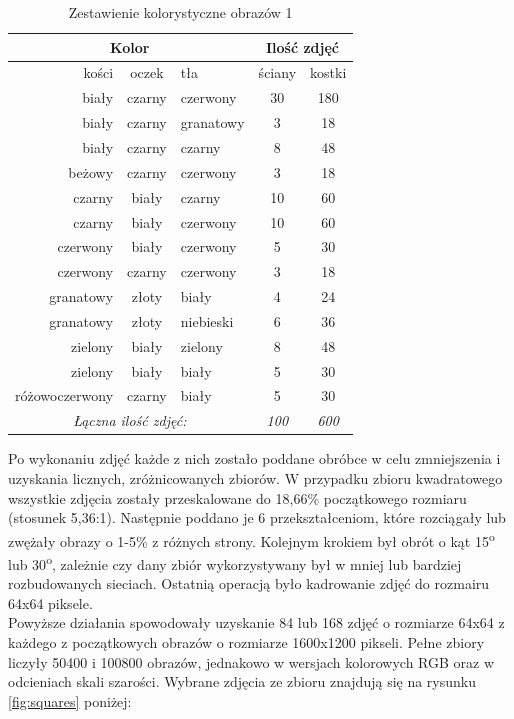 \begin{table}[h!]
\centering
\begin{tabular}{rcl|cc}
\multicolumn{3}{c}{Kolor} & \multicolumn{2}{c}{Ilość zdjęć} \\ \hline
kości & oczek & tła & ściany & kostki \\ \hline
biały & czarny & czerwony & 30 & 180 \\
biały & czarny & granatowy & 3 & 18 \\
biały & czarny & czarny & 8 & 48 \\
beżowy & czarny & czerwony & 3 & 18 \\
czarny & biały & czarny & 10 & 60 \\
czarny & biały & czerwony & 10 & 60 \\
czerwony & biały & czerwony & 5 & 30 \\
czerwony & czarny & czerwony & 3 & 18 \\
granatowy & złoty & biały & 4 & 24 \\
granatowy & złoty & niebieski & 6 & 36 \\
zielony & biały & zielony & 8 & 48 \\
zielony & biały & biały & 5 & 30 \\
różowoczerwony & czarny & biały & 5 & 30 \\ \hline
\multicolumn{3}{c}{\textit{Łączna ilość zdjęć:}} & \textit{100} & \textit{600}
\end{tabular}
\vspace{0.2cm}
\caption{Zestawienie kolorystyczne obrazów 1}
\label{tab:zestawienie1}
\end{table}
Po wykonaniu zdjęć każde z nich zostało poddane obróbce w celu zmniejszenia i uzyskania licznych,
zróżnicowanych zbiorów. W przypadku zbioru kwadratowego wszystkie zdjęcia zostały przeskalowane
do 18,66\% początkowego rozmiaru (stosunek 5,36:1). Następnie poddano je 6 przekształceniom, które
rozciągały lub zwężały obrazy o 1-5\% z różnych strony. Kolejnym krokiem był obrót o kąt
15\textsuperscript{o} lub 30\textsuperscript{o}, zależnie czy dany zbiór wykorzystywany był w mniej
lub bardziej rozbudowanych sieciach. Ostatnią operacją było kadrowanie zdjęć do rozmairu 64x64 piksele.\\
Powyższe działania spowodowały uzyskanie 84 lub 168 zdjęć o rozmiarze 64x64 z każdego
z początkowych obrazów o rozmiarze 1600x1200 pikseli. Pełne zbiory liczyły 50400 i 100800
obrazów, jednakowo w wersjach kolorowych RGB oraz w odcieniach skali szarości.
Wybrane zdjęcia ze zbioru znajdują się na rysunku \ref{fig:squares} poniżej: \newpage

